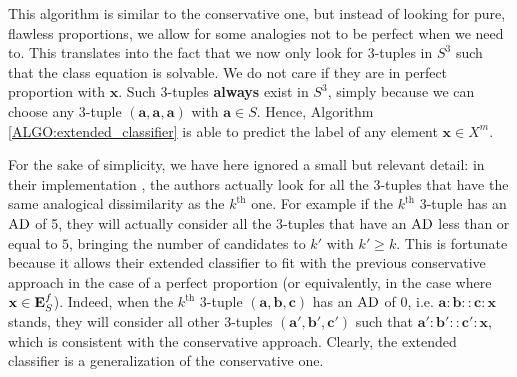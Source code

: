 This algorithm is similar to the conservative one, but instead of looking for
pure, flawless proportions, we allow for some analogies not to be perfect when
we need to. This translates into the fact that we now only
look for $3$-tuples in $S^3$ such that the class equation is solvable. We do
not care if they are in perfect proportion with $\mathbf{x}$. Such
$3$-tuples \textbf{always} exist in $S^3$, simply because we can choose any
$3$-tuple $(\mathbf{a}, \mathbf{a}, \mathbf{a})$ with $\mathbf{a} \in S$.
Hence, Algorithm \ref{ALGO:extended_classifier} is able to predict the label of
any element $\mathbf{x} \in X^m$.

For the sake of simplicity, we have here ignored a small but relevant detail:
in their implementation \cite{BayMicDelIJCAI07}, the authors actually look for
all the 3-tuples that have the same analogical dissimilarity as the
$k^\text{th}$ one. For example if the $k^\text{th}$ 3-tuple has an $\text{AD}$ of 5,
they will actually consider all the $3$-tuples that have an $\text{AD}$ less than or
equal to $5$, bringing the number of candidates to $k'$ with $k' \geq k$. This
is fortunate because it allows their extended classifier to
fit with the previous conservative approach in the case of a perfect
proportion (or equivalently, in the case where $\mathbf{x} \in \mathbf{E}_{S}^{f}$).  Indeed,
when the $k^\text{th}$ $3$-tuple $(\mathbf{a}, \mathbf{b}, \mathbf{c})$ has an
$\text{AD}$ of $0$, i.e. $\mathbf{a} : \mathbf{b} :: \mathbf{c} : \mathbf{x}$ stands,
they will consider all other $3$-tuples $(\mathbf{a}',
\mathbf{b}',\mathbf{c}')$ such that $\mathbf{a}' : \mathbf{b}' :: \mathbf{c}' :
\mathbf{x}$, which is consistent with the conservative approach. Clearly, the
extended classifier is a generalization of the conservative one.

